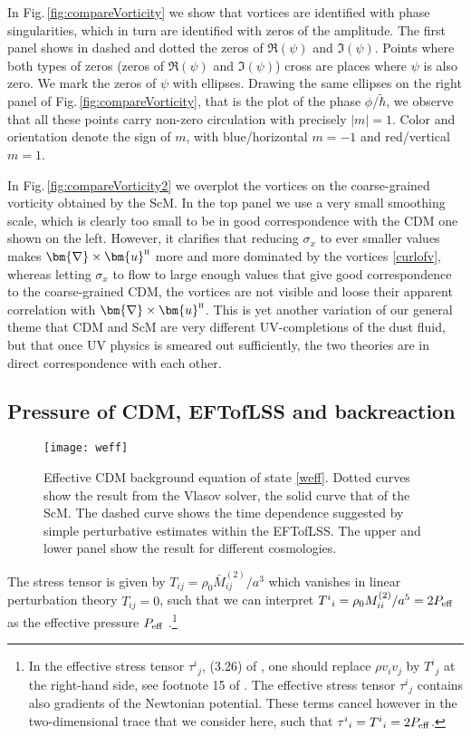 \documentclass[twocolumn, nofootinbib, showpacs, superscriptaddress]{revtex4-1}
\renewcommand{\H}[0]{{\textsc{h}}}
\newcommand{\sigx}{{\sigma_{\! x}}}
\newcommand{\thbar}{\tilde\hbar}
\newcommand{\vu}[0]{\bm{u} }
\newcommand{\vnabla}[0]{\bm{\nabla} }
\begin{document}
  In Fig.\,\ref{fig:compareVorticity} we show that vortices are identified with phase singularities, which in turn are identified with zeros of the amplitude.
  The first panel shows in dashed and dotted the zeros of $\Re(\psi)$ and $\Im(\psi)$. 
Points where both types of zeros (zeros of $\Re(\psi)$ and $\Im(\psi)$) cross are places where $\psi$ is also zero. We mark the zeros of $\psi$ with ellipses. 
Drawing the same ellipses on the right panel of  Fig.\,\ref{fig:compareVorticity}, that is the plot of the phase $\phi/\thbar$,
   we observe that all these points carry non-zero circulation with precisely $|m|=1$.
 Color and orientation denote the sign of $m$, with blue/horizontal $m=-1$ and red/vertical $m=1$.

  In Fig.\,\ref{fig:compareVorticity2} we overplot the vortices on the coarse-grained vorticity obtained by the ScM. In the top panel we use a very small smoothing scale, which is clearly too small to be in good correspondence with the CDM one shown on the left. 
 However, it clarifies that reducing $\sigx$ to ever smaller values makes  $\vnabla \times \vu^\H $ more and more dominated by the vortices \eqref{curlofv}, whereas letting $\sigx$ to flow to large enough values 
that give good correspondence to the coarse-grained CDM, the vortices are not visible and loose their apparent correlation with $\vnabla \times \vu^\H$.
  This is yet another variation of our general theme that CDM and ScM are very different  UV-completions of the dust fluid, but that once 
UV physics is smeared out sufficiently, the two theories are in direct correspondence with each other.
  




\subsection{Pressure of CDM, EFTofLSS and backreaction}
\label{sec:Pressure}
%
\begin{figure}[t]
    \centering
    \texttt{[image: weff]}
    \caption{Effective CDM background equation of state \eqref{weff}. Dotted curves show the result from the Vlasov solver, the solid curve
 that of the ScM. The dashed curve shows the time dependence suggested by simple perturbative estimates within the EFTofLSS.
 The upper and lower panel show the result for different cosmologies.}
    \label{fig:weff}
\end{figure} 
%
The stress tensor is given by $T_{ij}=\rho_0 \bar M^{(2)}_{ij}/a^3$ which vanishes in linear perturbation theory $T_{ij}=0$, such that we can interpret $T^i{}_{i} = \rho_0 M^{(2)}_{ii}/a^5 = 2 P_{\rm eff} $ as the effective pressure $P_{\rm eff}$ \cite{B10}.\footnote{In the effective stress tensor $\tau^i{}_j$, (3.26)  of \cite{B10}, one should replace $\rho v_i v_j$ by $T^{i}{}_j$ at the right-hand side, see footnote 15 of \cite{B10}. 
The effective stress tensor $\tau^i{}_j$ contains also gradients of the Newtonian potential. 
These terms cancel however in the two-dimensional trace that we consider here, such that $\tau^i{}_i = T^i{}_i=2 P_{\rm eff}$.}
\end{document}
